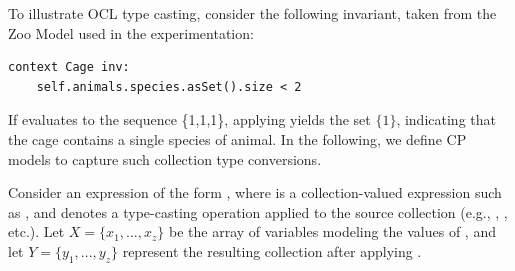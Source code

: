 
To illustrate OCL type casting, consider the following invariant, taken from the Zoo Model used in the experimentation:
\begin{lstlisting}
context Cage inv:
    self.animals.species.asSet().size < 2
\end{lstlisting}
If  evaluates to the sequence \{1,1,1\}, applying  yields the set $\{1\}$, indicating that the cage contains a single species of animal. In the following, we define CP models to capture such collection type conversions. 

Consider an expression of the form , where  is a collection-valued expression such as , and  denotes a type-casting operation applied to the source collection (e.g., , , etc.).
Let $X = \{x_1,...,x_z\}$ be the array of variables modeling the values of , and let $Y = \{y_1,...,y_z\}$ represent the resulting collection after applying .


